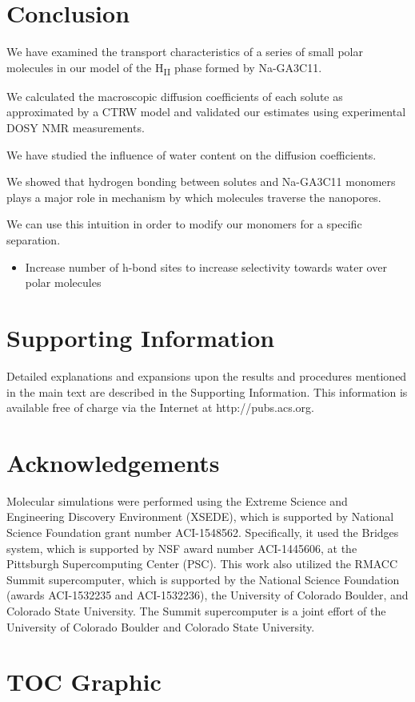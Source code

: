 \documentclass{article}
\begin{document}
  \section{Conclusion}

  We have examined the transport characteristics of a series of small polar
  molecules in our model of the H\textsubscript{II} phase formed by 
  Na-GA3C11.

  We calculated the macroscopic diffusion coefficients of each solute as 
  approximated by a CTRW model and validated our estimates using experimental
  DOSY NMR measurements.

  We have studied the influence of water content on the diffusion coefficients.

  We showed that hydrogen bonding between solutes and Na-GA3C11 monomers plays
  a major role in mechanism by which molecules traverse the nanopores. 

  We can use this intuition in order to modify our monomers for a specific 
  separation.
  \begin{itemize}
	\item Increase number of h-bond sites to increase selectivity towards water 
	over polar molecules
  \end{itemize}
  
 
  \section*{Supporting Information}

  Detailed explanations and expansions upon the results and procedures mentioned in
  the main text are described in the Supporting Information. This information is
  available free of charge via the Internet at http://pubs.acs.org.

  \section*{Acknowledgements}

  Molecular simulations were performed using the Extreme Science and
  Engineering Discovery Environment (XSEDE), which is supported by National
  Science Foundation grant number ACI-1548562. Specifically, it used the Bridges
  system, which is supported by NSF award number ACI-1445606, at the Pittsburgh
  Supercomputing Center (PSC). This work also utilized the RMACC Summit supercomputer,
  which is supported by the National Science Foundation (awards ACI-1532235 and
  ACI-1532236), the University of Colorado Boulder, and Colorado State
  University. The Summit supercomputer is a joint effort of the University of
  Colorado Boulder and Colorado State University.

  \clearpage

  
  

  \newpage

  \section*{TOC Graphic}
\end{document}
